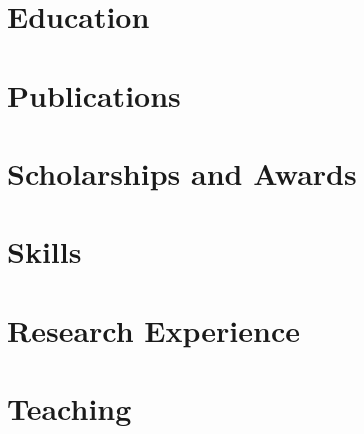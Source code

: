 \documentclass[14pt]{prometheus_cv}
\begin{document}
\thispagestyle{empty}					%
\pagestyle{fancy}			 		%

\vspace*{-1cm}
\centering 


\vspace*{0.4cm}
\section{Education}


\section{Publications}


\section{Scholarships and Awards}


\section{Skills}



\section{Research Experience}



\section{Teaching}

\end{document}
